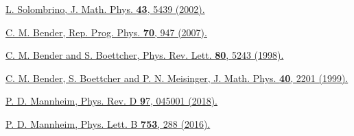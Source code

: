 \documentclass[aps]{revtex4}
\begin{document}
\begin{thebibliography}{99}
  \href{https://doi.org/10.1063/1.1504485}{L. Solombrino, J. Math. Phys.  \textbf{43}, 5439 (2002).}


  \href{http://iopscience.iop.org/article/10.1088/0034-4885/70/6/R03/meta}{C. M. Bender, Rep. Prog. Phys.  \textbf{70}, 947 (2007).}

 \href{https://doi.org/10.1103/PhysRevLett.80.5243}{C. M. Bender and S. Boettcher, Phys. Rev. Lett. \textbf{80}, 5243 (1998).}

 \href{https://doi.org/10.1063/1.532860}{C. M. Bender, S. Boettcher and P. N. Meisinger, J. Math. Phys. \textbf{40}, 2201 (1999).}

 \href{https://doi.org/10.1103/PhysRevD.97.045001}{P. D. Mannheim, Phys. Rev. D {\textbf 97},  045001 (2018).}

 \href{https://doi.org/10.1016/j.physletb.2015.12.033}{P. D. Mannheim, Phys. Lett. B \textbf{753}, 288 (2016).}



\end{thebibliography}
\end{document}
